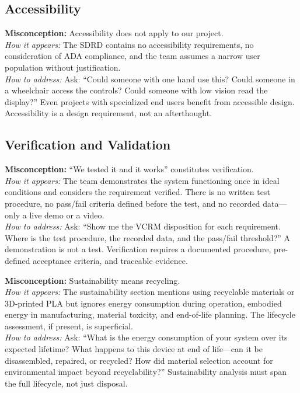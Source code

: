 \subsection{Accessibility}

\begin{redflag}
\textbf{Misconception:} Accessibility does not apply to our project.\\
\textit{How it appears:} The SDRD contains no accessibility requirements, no consideration of ADA compliance, and the team assumes a narrow user population without justification.\\
\textit{How to address:} Ask: ``Could someone with one hand use this? Could someone in a wheelchair access the controls? Could someone with low vision read the display?'' Even projects with specialized end users benefit from accessible design. Accessibility is a design requirement, not an afterthought.
\end{redflag}

\subsection{Verification and Validation}

\begin{redflag}
\textbf{Misconception:} ``We tested it and it works'' constitutes verification.\\
\textit{How it appears:} The team demonstrates the system functioning once in ideal conditions and considers the requirement verified. There is no written test procedure, no pass/fail criteria defined before the test, and no recorded data---only a live demo or a video.\\
\textit{How to address:} Ask: ``Show me the VCRM disposition for each requirement. Where is the test procedure, the recorded data, and the pass/fail threshold?'' A demonstration is not a test. Verification requires a documented procedure, pre-defined acceptance criteria, and traceable evidence.
\end{redflag}

\begin{redflag}
\textbf{Misconception:} Sustainability means recycling.\\
\textit{How it appears:} The sustainability section mentions using recyclable materials or 3D-printed PLA but ignores energy consumption during operation, embodied energy in manufacturing, material toxicity, and end-of-life planning. The lifecycle assessment, if present, is superficial.\\
\textit{How to address:} Ask: ``What is the energy consumption of your system over its expected lifetime? What happens to this device at end of life---can it be disassembled, repaired, or recycled? How did material selection account for environmental impact beyond recyclability?'' Sustainability analysis must span the full lifecycle, not just disposal.
\end{redflag}


